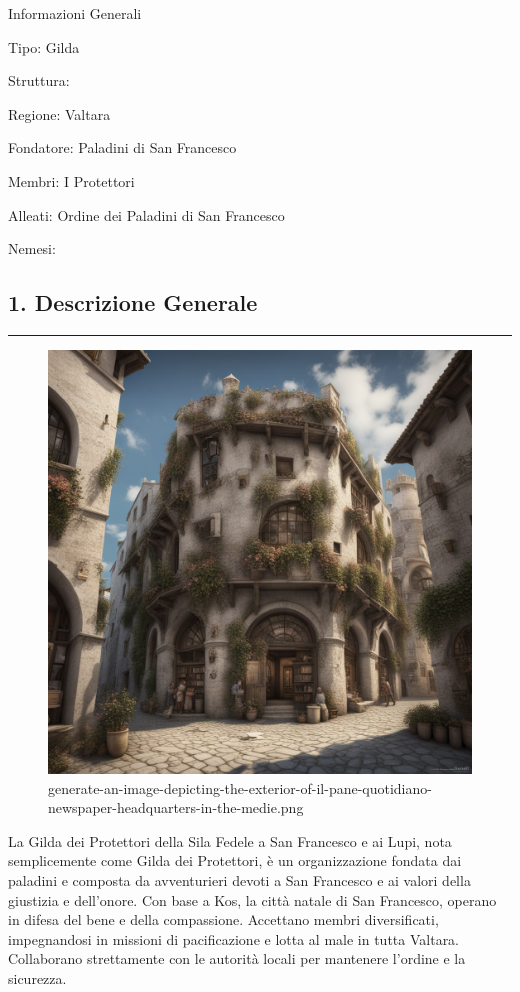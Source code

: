 Informazioni Generali

Tipo: Gilda

Struttura:

Regione: Valtara

Fondatore: Paladini di San Francesco

Membri: I Protettori

Alleati: Ordine dei Paladini di San Francesco

Nemesi:

\subsection{1. Descrizione Generale}\label{descrizione-generale}

\begin{center}\rule{0.5\linewidth}{0.5pt}\end{center}

\begin{figure}
\centering
\includegraphics{generate-an-image-depicting-the-exterior-of-il-pane-quotidiano-newspaper-headquarters-in-the-medie.png}
\caption{generate-an-image-depicting-the-exterior-of-il-pane-quotidiano-newspaper-headquarters-in-the-medie.png}
\end{figure}

La Gilda dei Protettori della Sila Fedele a San Francesco e ai Lupi,
nota semplicemente come Gilda dei Protettori, è un organizzazione
fondata dai paladini e composta da avventurieri devoti a San Francesco e
ai valori della giustizia e dell'onore. Con base a Kos, la città natale
di San Francesco, operano in difesa del bene e della compassione.
Accettano membri diversificati, impegnandosi in missioni di
pacificazione e lotta al male in tutta Valtara. Collaborano strettamente
con le autorità locali per mantenere l'ordine e la sicurezza.

